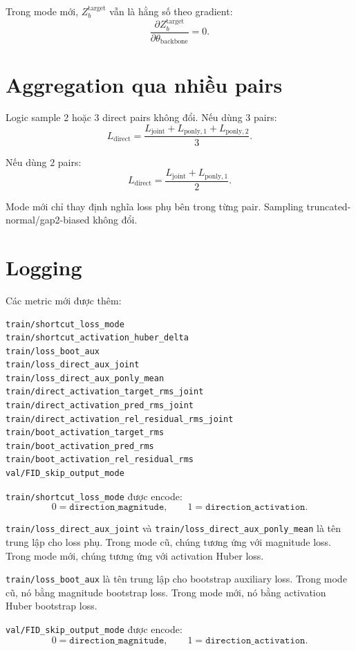\documentclass[11pt]{article}
\begin{document}
Trong mode mới, \(Z_b^{\text{target}}\) vẫn là hằng số theo gradient:
\[
\frac{\partial Z_b^{\text{target}}}{\partial \theta_{\text{backbone}}} = 0.
\]

\section{Aggregation qua nhiều pairs}

Logic sample 2 hoặc 3 direct pairs không đổi.
Nếu dùng 3 pairs:
\[
L_{\text{direct}}
=
\frac{
L_{\text{joint}}
+ L_{\text{ponly},1}
+ L_{\text{ponly},2}
}{3}.
\]

Nếu dùng 2 pairs:
\[
L_{\text{direct}}
=
\frac{
L_{\text{joint}}
+ L_{\text{ponly},1}
}{2}.
\]

Mode mới chỉ thay định nghĩa loss phụ bên trong từng pair.
Sampling truncated-normal/gap2-biased không đổi.

\section{Logging}

Các metric mới được thêm:

\begin{verbatim}
train/shortcut_loss_mode
train/shortcut_activation_huber_delta
train/loss_boot_aux
train/loss_direct_aux_joint
train/loss_direct_aux_ponly_mean
train/direct_activation_target_rms_joint
train/direct_activation_pred_rms_joint
train/direct_activation_rel_residual_rms_joint
train/boot_activation_target_rms
train/boot_activation_pred_rms
train/boot_activation_rel_residual_rms
val/FID_skip_output_mode
\end{verbatim}

\texttt{train/shortcut\_loss\_mode} được encode:
\[
0 = \texttt{direction\_magnitude},
\qquad
1 = \texttt{direction\_activation}.
\]

\texttt{train/loss\_direct\_aux\_joint} và \texttt{train/loss\_direct\_aux\_ponly\_mean} là tên trung lập cho loss phụ.
Trong mode cũ, chúng tương ứng với magnitude loss.
Trong mode mới, chúng tương ứng với activation Huber loss.

\texttt{train/loss\_boot\_aux} là tên trung lập cho bootstrap auxiliary loss.
Trong mode cũ, nó bằng magnitude bootstrap loss.
Trong mode mới, nó bằng activation Huber bootstrap loss.

\texttt{val/FID\_skip\_output\_mode} được encode:
\[
0 = \texttt{direction\_magnitude},
\qquad
1 = \texttt{direction\_activation}.
\]
\end{document}

